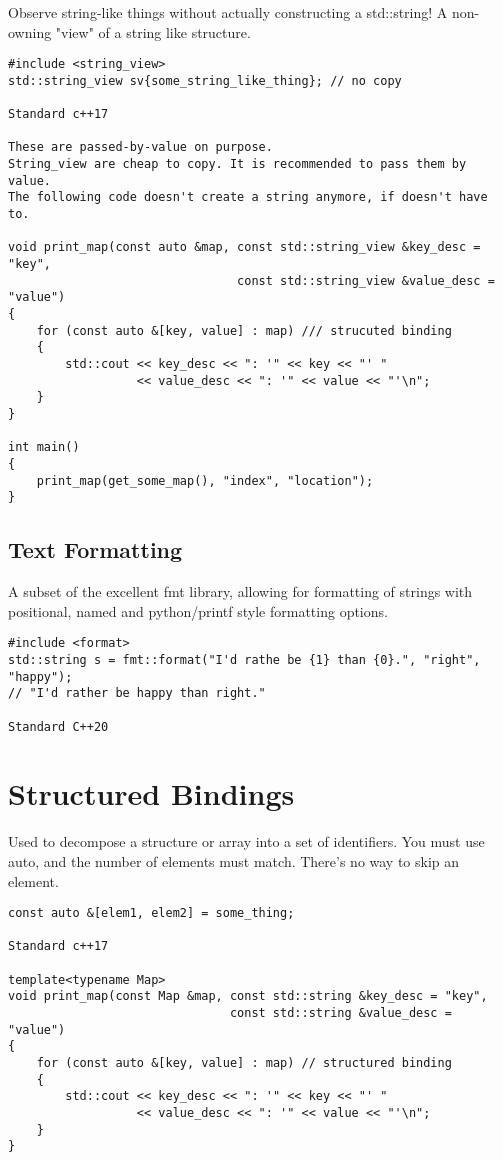\documentclass[openany]{report}
\begin{document}
Observe string-like things without actually constructing a std::string!
A non-owning "view" of a string like structure.

\begin{verbatim}
#include <string_view>
std::string_view sv{some_string_like_thing}; // no copy

Standard c++17

These are passed-by-value on purpose.
String_view are cheap to copy. It is recommended to pass them by value.
The following code doesn't create a string anymore, if doesn't have to.

void print_map(const auto &map, const std::string_view &key_desc = "key",
                                const std::string_view &value_desc = "value")
{
    for (const auto &[key, value] : map) /// strucuted binding
    {
        std::cout << key_desc << ": '" << key << "' "
                  << value_desc << ": '" << value << "'\n";
    }
}

int main()
{
    print_map(get_some_map(), "index", "location");
}
\end{verbatim}

\subsection{Text Formatting}

A subset of the excellent {fmt} library, allowing for formatting of strings with positional,
named and python/printf style formatting options.

\begin{verbatim}
#include <format>
std::string s = fmt::format("I'd rathe be {1} than {0}.", "right", "happy");
// "I'd rather be happy than right."

Standard C++20
\end{verbatim}

\section{Structured Bindings}

Used to decompose a structure or array into a set of identifiers.
You must use auto, and the number of elements must match. There's no way to skip an element.

\begin{verbatim}
const auto &[elem1, elem2] = some_thing;

Standard c++17

template<typename Map>
void print_map(const Map &map, const std::string &key_desc = "key",
                               const std::string &value_desc = "value")
{
    for (const auto &[key, value] : map) // structured binding
    {
        std::cout << key_desc << ": '" << key << "' "
                  << value_desc << ": '" << value << "'\n";
    }
}
\end{verbatim}
\end{document}
